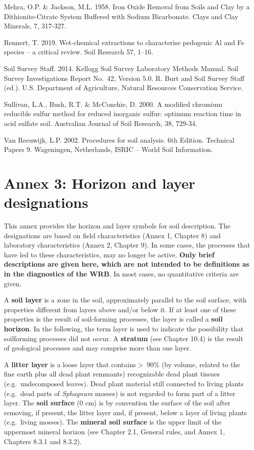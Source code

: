 \documentclass[
  letterpaper,
  DIV=11,
  numbers=noendperiod]{scrreprt}
\begin{document}
Mehra, O.P. \& Jackson, M.L. 1958. Iron Oxide Removal from Soils and
Clay by a Dithionite-Citrate System Buffered with Sodium Bicarbonate.
Clays and Clay Minerals, 7, 317-327.

Rennert, T. 2019. Wet-chemical extractions to characterise pedogenic Al
and Fe species -- a critical review. Soil Research 57, 1--16.

Soil Survey Staff. 2014. Kellogg Soil Survey Laboratory Methods Manual.
Soil Survey Investigations Report No.~42, Version 5.0. R. Burt and Soil
Survey Staff (ed.). U.S. Department of Agriculture, Natural Resources
Conservation Service.

Sullivan, L.A., Bush, R.T. \& McConchie, D. 2000. A modified chromium
reducible sulfur method for reduced inorganic sulfur: optimum reaction
time in acid sulfate soil. Australian Journal of Soil Research, 38,
729-34.

Van Reeuwijk, L.P. 2002. Procedures for soil analysis. 6th Edition.
Technical Papers 9. Wageningen, Netherlands, ISRIC -- World Soil
Information.


\hypertarget{annex-3-horizon-and-layer-designations}{%
\chapter{Annex 3: Horizon and layer
designations}\label{annex-3-horizon-and-layer-designations}}

This annex provides the horizon and layer symbols for soil description.
The designations are based on field characteristics (Annex 1, Chapter 8)
and laboratory characteristics (Annex 2, Chapter 9). In some cases, the
processes that have led to these characteristics, may no longer be
active. \textbf{Only brief descriptions are given here, which are not
intended to be definitions as in the diagnostics of the WRB}. In most
cases, no quantitative criteria are given.

A \textbf{soil layer} is a zone in the soil, approximately parallel to
the soil surface, with properties different from layers above and/or
below it. If at least one of these properties is the result of
soil-forming processes, the layer is called a \textbf{soil horizon}. In
the following, the term layer is used to indicate the possibility that
soilforming processes did not occur. A \textbf{stratum} (see Chapter
10.4) is the result of geological processes and may comprise more than
one layer.

A \textbf{litter layer} is a loose layer that contains \textgreater~90\%
(by volume, related to the fine earth plus all dead plant remmants)
recognizable dead plant tissues (e.g.~undecomposed leaves). Dead plant
material still connected to living plants (e.g.~dead parts of
\emph{Sphagnum} mosses) is not regarded to form part of a litter layer.
The \textbf{soil surface} (0 cm) is by convention the surface of the
soil after removing, if present, the litter layer and, if present, below
a layer of living plants (e.g.~living mosses). The \textbf{mineral soil
surface} is the upper limit of the uppermost mineral horizon (see
Chapter 2.1, General rules, and Annex 1, Chapters 8.3.1 and 8.3.2).
\end{document}
